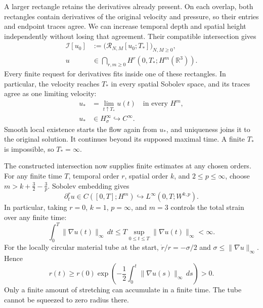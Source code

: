 A larger rectangle retains the derivatives already present. On each
overlap, both rectangles contain derivatives of the original velocity and
pressure, so their entries and endpoint traces agree. We can increase
temporal depth and spatial height independently without losing that
agreement. Their compatible intersection gives
\[
 \begin{aligned}
 \mathcal I[u_0]
 &:=\bigl(\mathcal R_{N,M}[u_0;T_*]\bigr)_{N,M\ge0},\\
 u&\in\bigcap_{r,m\ge0}H^r(0,T_*;H^m(\mathbb R^3)).
 \end{aligned}
\]
Every finite request for derivatives fits inside one of these rectangles.
In particular, the velocity reaches \(T_*\) in every spatial Sobolev
space, and its traces agree as one limiting velocity:
\[
 \begin{aligned}
 u_*&=\lim_{t\uparrow T_*}u(t)\quad\text{in every }H^m,\\
 u_*&\in H^\infty_\sigma\hookrightarrow C^\infty.
 \end{aligned}
\]
Smooth local existence starts the flow again from \(u_*\), and uniqueness
joins it to the original solution. It continues beyond its supposed
maximal time. A finite \(T_*\) is impossible, so \(T_*=\infty\).

The constructed intersection now supplies finite estimates at any chosen
orders. For any finite time \(T\), temporal order \(r\), spatial order
\(k\), and \(2\le p\le\infty\), choose
\(m>k+\tfrac32-\tfrac3p\). Sobolev embedding gives
\[
 \partial_t^ru\in C([0,T];H^m)
 \hookrightarrow L^\infty(0,T;W^{k,p}).
\]
In particular, taking \(r=0\), \(k=1\), \(p=\infty\), and \(m=3\)
controls the total strain over any finite time:
\[
 \int_0^T\|\nabla u(t)\|_\infty\,dt
 \le T\sup_{0\le t\le T}\|\nabla u(t)\|_\infty<\infty.
\]
For the locally circular material tube at the start,
\(\dot r/r=-\sigma/2\) and \(\sigma\le\|\nabla u\|_\infty\). Hence
\[
 r(t)\ge r(0)\exp\!\left(
 -\frac12\int_0^t\|\nabla u(s)\|_\infty\,ds
 \right)>0.
\]
Only a finite amount of stretching can accumulate in a finite time.
The tube cannot be squeezed to zero radius there.

\endgroup
